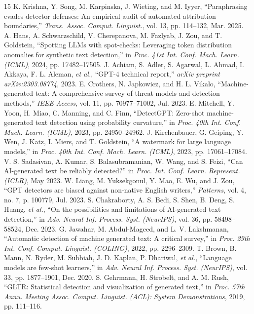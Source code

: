\documentclass[conference]{IEEEtran}
\begin{document}
\begin{thebibliography}{15}
 K. Krishna, Y. Song, M. Karpinska, J. Wieting, and M. Iyyer, ``Paraphrasing evades detector defenses: An empirical audit of automated attribution boundaries,'' \textit{Trans. Assoc. Comput. Linguist.}, vol. 13, pp. 114--132, Mar. 2025.
 A. Hans, A. Schwarzschild, V. Cherepanova, M. Fazlyab, J. Zou, and T. Goldstein, ``Spotting LLMs with spot-checks: Leveraging token distribution anomalies for synthetic text detection,'' in \textit{Proc. 41st Int. Conf. Mach. Learn. (ICML)}, 2024, pp. 17482--17505.
 J. Achiam, S. Adler, S. Agarwal, L. Ahmad, I. Akkaya, F. L. Aleman, \textit{et al.}, ``GPT-4 technical report,'' \textit{arXiv preprint arXiv:2303.08774}, 2023.
 E. Crothers, N. Japkowicz, and H. L. Vikalo, ``Machine-generated text: A comprehensive survey of threat models and detection methods,'' \textit{IEEE Access}, vol. 11, pp. 70977--71002, Jul. 2023.
 E. Mitchell, Y. Yoon, H. Miao, C. Manning, and C. Finn, ``DetectGPT: Zero-shot machine-generated text detection using probability curvature,'' in \textit{Proc. 40th Int. Conf. Mach. Learn. (ICML)}, 2023, pp. 24950--24962.
 J. Kirchenbauer, G. Geiping, Y. Wen, J. Katz, I. Miers, and T. Goldstein, ``A watermark for large language models,'' in \textit{Proc. 40th Int. Conf. Mach. Learn. (ICML)}, 2023, pp. 17061--17084.
 V. S. Sadasivan, A. Kumar, S. Balasubramanian, W. Wang, and S. Feizi, ``Can AI-generated text be reliably detected?'' in \textit{Proc. Int. Conf. Learn. Represent. (ICLR)}, May 2023.
 W. Liang, M. Yuksekgonul, Y. Mao, E. Wu, and J. Zou, ``GPT detectors are biased against non-native English writers,'' \textit{Patterns}, vol. 4, no. 7, p. 100779, Jul. 2023.
 S. Chakraborty, A. S. Bedi, S. Shen, B. Deng, S. Huang, \textit{et al.}, ``On the possibilities and limitations of AI-generated text detection,'' in \textit{Adv. Neural Inf. Process. Syst. (NeurIPS)}, vol. 36, pp. 58498--58524, Dec. 2023.
 G. Jawahar, M. Abdul-Mageed, and L. V. Lakshmanan, ``Automatic detection of machine generated text: A critical survey,'' in \textit{Proc. 29th Int. Conf. Comput. Linguist. (COLING)}, 2022, pp. 2296--2309.
 T. Brown, B. Mann, N. Ryder, M. Subbiah, J. D. Kaplan, P. Dhariwal, \textit{et al.}, ``Language models are few-shot learners,'' in \textit{Adv. Neural Inf. Process. Syst. (NeurIPS)}, vol. 33, pp. 1877--1901, Dec. 2020.
 S. Gehrmann, H. Strobelt, and A. M. Rush, ``GLTR: Statistical detection and visualization of generated text,'' in \textit{Proc. 57th Annu. Meeting Assoc. Comput. Linguist. (ACL): System Demonstrations}, 2019, pp. 111--116.

\end{thebibliography}
\end{document}
